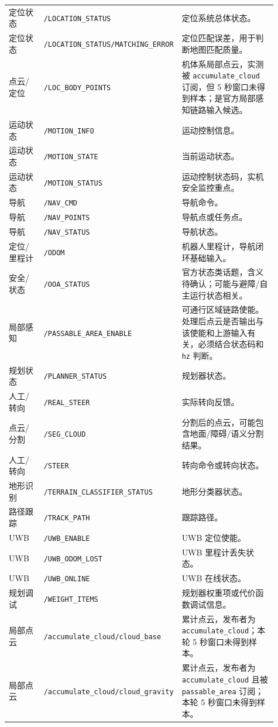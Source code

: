 \documentclass[UTF8,11pt,a4paper]{ctexart}
\begin{document}
{\begin{longtable}{p{0.17\linewidth}p{0.31\linewidth}p{0.43\linewidth}}
定位状态 & \texttt{/LOCATION\_STATUS} & 定位系统总体状态。\\
定位状态 & \texttt{/LOCATION\_STATUS/MATCHING\_ERROR} & 定位匹配误差，用于判断地图匹配质量。\\
点云/定位 & \texttt{/LOC\_BODY\_POINTS} & 机体系局部点云，实测被 \texttt{accumulate\_cloud} 订阅，但 5 秒窗口未得到样本；是官方局部感知链路输入候选。\\
运动状态 & \texttt{/MOTION\_INFO} & 运动控制信息。\\
运动状态 & \texttt{/MOTION\_STATE} & 当前运动状态。\\
运动状态 & \texttt{/MOTION\_STATUS} & 运动控制状态码，实机安全监控重点。\\
导航 & \texttt{/NAV\_CMD} & 导航命令。\\
导航 & \texttt{/NAV\_POINTS} & 导航点或任务点。\\
导航 & \texttt{/NAV\_STATUS} & 导航状态。\\
定位/里程计 & \texttt{/ODOM} & 机器人里程计，导航闭环基础输入。\\
安全/状态 & \texttt{/OOA\_STATUS} & 官方状态类话题，含义待确认；可能与避障/自主运行状态相关。\\
局部感知 & \texttt{/PASSABLE\_AREA\_ENABLE} & 可通行区域链路使能。处理后点云是否输出与该使能和上游输入有关，必须结合状态码和 \texttt{hz} 判断。\\
规划状态 & \texttt{/PLANNER\_STATUS} & 规划器状态。\\
人工/转向 & \texttt{/REAL\_STEER} & 实际转向反馈。\\
点云/分割 & \texttt{/SEG\_CLOUD} & 分割后的点云，可能包含地面/障碍/语义分割结果。\\
人工/转向 & \texttt{/STEER} & 转向命令或转向状态。\\
地形识别 & \texttt{/TERRAIN\_CLASSIFIER\_STATUS} & 地形分类器状态。\\
路径跟踪 & \texttt{/TRACK\_PATH} & 跟踪路径。\\
UWB & \texttt{/UWB\_ENABLE} & UWB 定位使能。\\
UWB & \texttt{/UWB\_ODOM\_LOST} & UWB 里程计丢失状态。\\
UWB & \texttt{/UWB\_ONLINE} & UWB 在线状态。\\
规划调试 & \texttt{/WEIGHT\_ITEMS} & 规划器权重项或代价函数调试信息。\\
局部点云 & \texttt{/accumulate\_cloud/cloud\_base} & 累计点云，发布者为 \texttt{accumulate\_cloud}；本轮 5 秒窗口未得到样本。\\
局部点云 & \texttt{/accumulate\_cloud/cloud\_gravity} & 累计点云，发布者为 \texttt{accumulate\_cloud} 且被 \texttt{passable\_area} 订阅；本轮 5 秒窗口未得到样本。\\

\end{longtable}}
\end{document}
